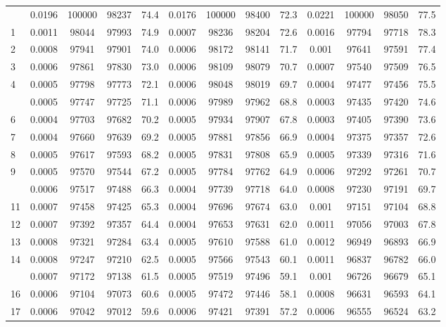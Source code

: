 \documentclass[
  14pt,
]{article}
\begin{document}
\begin{longtable}[t]{lcccccccccccc}
\endfoot
\bottomrule
\endlastfoot
0 & 0.0196 & 100000 & 98237 & 74.4 & 0.0176 & 100000 & 98400 & 72.3 & 0.0221 & 100000 & 98050 & 77.5\\
1 & 0.0011 & 98044 & 97993 & 74.9 & 0.0007 & 98236 & 98204 & 72.6 & 0.0016 & 97794 & 97718 & 78.3\\
2 & 0.0008 & 97941 & 97901 & 74.0 & 0.0006 & 98172 & 98141 & 71.7 & 0.001 & 97641 & 97591 & 77.4\\
3 & 0.0006 & 97861 & 97830 & 73.0 & 0.0006 & 98109 & 98079 & 70.7 & 0.0007 & 97540 & 97509 & 76.5\\
4 & 0.0005 & 97798 & 97773 & 72.1 & 0.0006 & 98048 & 98019 & 69.7 & 0.0004 & 97477 & 97456 & 75.5\\
\addlinespace
5 & 0.0005 & 97747 & 97725 & 71.1 & 0.0006 & 97989 & 97962 & 68.8 & 0.0003 & 97435 & 97420 & 74.6\\
6 & 0.0004 & 97703 & 97682 & 70.2 & 0.0005 & 97934 & 97907 & 67.8 & 0.0003 & 97405 & 97390 & 73.6\\
7 & 0.0004 & 97660 & 97639 & 69.2 & 0.0005 & 97881 & 97856 & 66.9 & 0.0004 & 97375 & 97357 & 72.6\\
8 & 0.0005 & 97617 & 97593 & 68.2 & 0.0005 & 97831 & 97808 & 65.9 & 0.0005 & 97339 & 97316 & 71.6\\
9 & 0.0005 & 97570 & 97544 & 67.2 & 0.0005 & 97784 & 97762 & 64.9 & 0.0006 & 97292 & 97261 & 70.7\\
\addlinespace
10 & 0.0006 & 97517 & 97488 & 66.3 & 0.0004 & 97739 & 97718 & 64.0 & 0.0008 & 97230 & 97191 & 69.7\\
11 & 0.0007 & 97458 & 97425 & 65.3 & 0.0004 & 97696 & 97674 & 63.0 & 0.001 & 97151 & 97104 & 68.8\\
12 & 0.0007 & 97392 & 97357 & 64.4 & 0.0004 & 97653 & 97631 & 62.0 & 0.0011 & 97056 & 97003 & 67.8\\
13 & 0.0008 & 97321 & 97284 & 63.4 & 0.0005 & 97610 & 97588 & 61.0 & 0.0012 & 96949 & 96893 & 66.9\\
14 & 0.0008 & 97247 & 97210 & 62.5 & 0.0005 & 97566 & 97543 & 60.1 & 0.0011 & 96837 & 96782 & 66.0\\
\addlinespace
15 & 0.0007 & 97172 & 97138 & 61.5 & 0.0005 & 97519 & 97496 & 59.1 & 0.001 & 96726 & 96679 & 65.1\\
16 & 0.0006 & 97104 & 97073 & 60.6 & 0.0005 & 97472 & 97446 & 58.1 & 0.0008 & 96631 & 96593 & 64.1\\
17 & 0.0006 & 97042 & 97012 & 59.6 & 0.0006 & 97421 & 97391 & 57.2 & 0.0006 & 96555 & 96524 & 63.2\\

\end{longtable}
\end{document}
